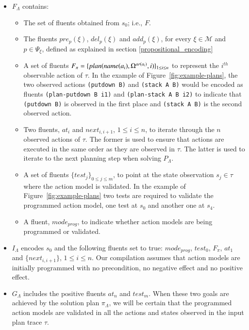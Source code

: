 \begin{itemize}

\item $F_{\Lambda}$ contains:
\begin{itemize}
\item The set of fluents obtained from $s_0$; i.e., $F$.
\item The fluents $pre_p(\xi)$, $del_p(\xi)$ and $add_p(\xi)$, for every $\xi \in \mathcal{M}$ and $p\in \Psi_{\xi}$, defined as explained in section \ref{propositional_encoding}
\item A set of fluents $F_{\pi}=\{plan(name(a_i),\Omega^{ar(a_i)},i)\}_{\small 1\leq i\leq n}$ to represent the $i^{th}$ observable action of $\tau$. In the example of Figure~\ref{fig:example-plans}, the two observed actions {\small \texttt{(putdown B)}} and {\small \texttt{(stack  A  B)}} would be encoded as fluents  {\small \texttt{(plan-putdown B i1)}} and {\small \texttt{(plan-stack A B i2)}} to indicate that {\small \texttt{(putdown B)}} is observed in the first place and {\small \texttt{(stack  A  B)}} is the second observed action.
\item Two fluents, $at_i$ and $next_{i,i+1}$, {\small $1\leq i \leq n$}, to iterate through the $n$ observed actions of $\tau$. The former is used to ensure that actions are executed in the same order as they are observed in $\tau$. The latter is used to iterate to the next planning step when solving $P_{\Lambda}$.
\item A set of fluents $\{test_j\}_{0\leq j\leq m}$, to point at the state observation $s_j\in\tau$ where the action model is
validated. In the example of Figure~\ref{fig:example-plans} two tests are required to validate the programmed action model, one test at $s_0$ and another one at $s_4$.
\item A fluent, $mode_{prog}$, to indicate whether action models are being programmed or validated.
\end{itemize}

\item $I_{\Lambda}$ encodes $s_0$ and the following fluents set to true: $mode_{prog}$, $test_0$, $F_{\pi}$, $at_1$ and $\{next_{i,i+1}\}$, {\small $1\leq i \leq n$}. Our compilation assumes that action models are initially programmed with no precondition, no negative effect and no positive effect.

\item $G_{\Lambda}$ includes the positive fluents $at_n$ and $test_m$. When these two goals are achieved by the solution plan $\pi_\Lambda$, we will be certain that the programmed action models are validated in all the actions and states observed in the input plan trace $\tau$.


\end{itemize}
